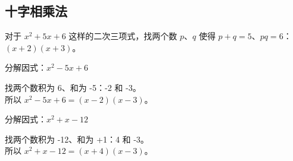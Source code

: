 \subsection*{十字相乘法}

对于 $x^2 + 5x + 6$ 这样的二次三项式，找两个数 $p$、$q$ 使得 $p+q=5$、$pq=6$：
$(x+2)(x+3)$。

\begin{example}
分解因式：$x^2 - 5x + 6$
\end{example}
\begin{solution}
找两个数积为 6、和为 -5：-2 和 -3。\\
所以 $x^2 - 5x + 6 = (x-2)(x-3)$。
\end{solution}

\begin{example}
分解因式：$x^2 + x - 12$
\end{example}
\begin{solution}
找两个数积为 -12、和为 +1：4 和 -3。\\
所以 $x^2 + x - 12 = (x+4)(x-3)$。
\end{solution}

